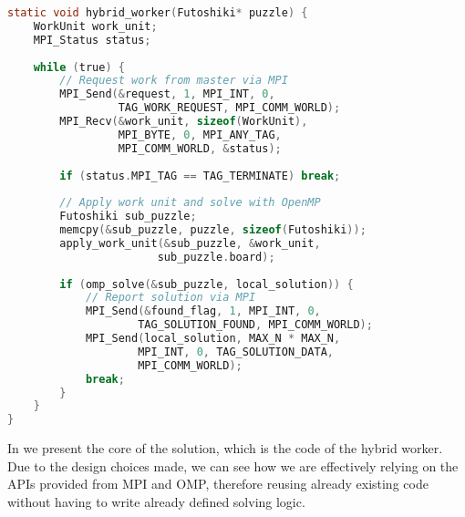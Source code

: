 \begin{lstlisting}[language=C, caption=Hybrid worker with nested parallelism, label={listing:hybrid_worker}]
static void hybrid_worker(Futoshiki* puzzle) {
    WorkUnit work_unit;
    MPI_Status status;
    
    while (true) {
        // Request work from master via MPI
        MPI_Send(&request, 1, MPI_INT, 0, 
                 TAG_WORK_REQUEST, MPI_COMM_WORLD);
        MPI_Recv(&work_unit, sizeof(WorkUnit), 
                 MPI_BYTE, 0, MPI_ANY_TAG, 
                 MPI_COMM_WORLD, &status);
        
        if (status.MPI_TAG == TAG_TERMINATE) break;
        
        // Apply work unit and solve with OpenMP
        Futoshiki sub_puzzle;
        memcpy(&sub_puzzle, puzzle, sizeof(Futoshiki));
        apply_work_unit(&sub_puzzle, &work_unit, 
                       sub_puzzle.board);
        
        if (omp_solve(&sub_puzzle, local_solution)) {
            // Report solution via MPI
            MPI_Send(&found_flag, 1, MPI_INT, 0, 
                    TAG_SOLUTION_FOUND, MPI_COMM_WORLD);
            MPI_Send(local_solution, MAX_N * MAX_N, 
                    MPI_INT, 0, TAG_SOLUTION_DATA, 
                    MPI_COMM_WORLD);
            break;
        }
    }
}
\end{lstlisting}

In  we present the core of the solution, which is the code of the hybrid worker. Due to the design choices made, we can see how we are effectively relying on the APIs provided from MPI and OMP, therefore reusing already existing code without having to write already defined solving logic.